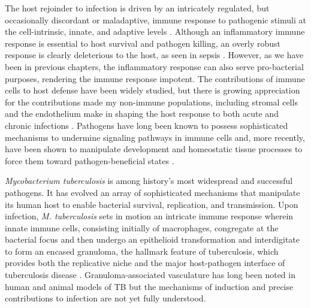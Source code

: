 The host rejoinder to infection is driven by an intricately regulated, but occasionally discordant or maladaptive, immune response to pathogenic stimuli at the cell-intrinsic, innate, and adaptive levels \citep{Iwasaki2010, Finlay2006, Haldar2015, MacMicking2004, MacMicking2012, Kim2012}. Although an inflammatory immune response is essential to host survival and pathogen killing, an overly robust response is clearly deleterious to the host, as seen in sepsis \citep{Finethy2020}. However, as we have been in previous chapters, the inflammatory response can also serve pro-bacterial purposes, rendering the immune response impotent. The contributions of immune cells to host defense have been widely studied, but there is growing appreciation for the contributions made my non-immune populations, including stromal cells and the endothelium \citep{Honan2021, Worrell2021, Amersfoort2022, Honan2021} make in shaping the host response to both acute and chronic infections \citep{Mueller2009, Randow2013, Krishnamurty2020}. Pathogens have long been known to possess sophisticated mechanisms to undermine signaling pathways in immune cells and, more recently, have been shown to manipulate development and homeostatic tissue processes to force them toward pathogen-beneficial states \citep{Menzies1998, Guichard2013}.

\textit{Mycobacterium tuberculosis} is among history's most widespread and successful pathogens. It has evolved an array of sophisticated mechanisms that manipulate its human host to enable bacterial survival, replication, and transmission. Upon infection, \textit{M. tuberculosis} sets in motion an intricate immune response wherein innate immune cells, consisting initially of macrophages, congregate at the bacterial focus and then undergo an epithelioid transformation and interdigitate to form an encased granuloma, the hallmark feature of tuberculosis, which provides both the replicative niche and the major host-pathogen interface of tuberculosis disease \citep{Cronan2016, Pagan2018, Cronan2021}. Granuloma-associated vasculature has long been noted in human and animal models of TB \citep{Cudkowicz1952, Russell2010} but the mechanisms of induction and precise contributions to infection are not yet fully understood.


